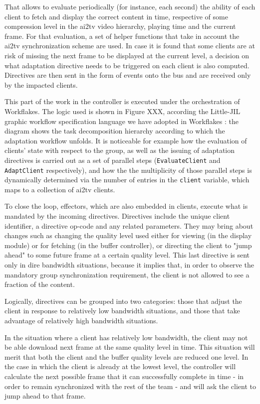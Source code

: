 \documentclass{sig-alternate}
\begin{document}
That allows to evaluate periodically (for instance, each second) the
ability of each client to fetch and display the correct content in
time, respective of some compression level in the ai2tv video
hierarchy, playing time and the current frame.  For that evaluation, a
set of helper functions that take in account the ai2tv synchronization
scheme are used. In case it is found that some clients are at risk of
missing the next frame to be displayed at the current level, a
decision on what adaptation directive needs to be triggered on each
client is also computed.  Directives are then sent in the form of
events onto the bus and are received only by the impacted clients.

This part of the work in the controller is executed under the
orchestration of Workflakes.  The logic used is shown in Figure XXX,
according the Little-JIL graphic workflow specification language we
have adopted in Workflakes \cite{L-JIL}: the diagram shows the task
decomposition hierarchy according to which the adaptation workflow
unfolds. It is noticeable for example how the evaluation of clients'
state with respect to the group, as well as the issuing of adaptation
directives is carried out as a set of parallel steps
(\texttt{EvaluateClient} and \texttt{AdaptClient} respectively), and
how the the multiplicity of those parallel steps is dynamically
determined via the number of entries in the \texttt{client} variable,
which maps to a collection of ai2tv clients.
%
%

To close the loop, effectors, which are also embedded in clients,
execute what is mandated by the incoming directives.  Directives
include the unique client identifier, a directive op-code and any
related parameters.  They may bring about changes such as changing the
quality level used either for viewing (in the display module) or for
fetching (in the buffer controller), or directing the client to "jump
ahead" to some future frame at a certain quality level.  This last
directive is sent only in dire bandwidth situations, because it
implies that, in order to observe the mandatory group synchronization
requirement, the client is not allowed to see a fraction of the
content.

Logically, directives can be grouped into two categories: those that
adjust the client in response to relatively low bandwidth situations,
and those that take advantage of relatively high bandwidth situations.

In the situation where a client has relatively low bandwidth, the
client may not be able download next frame at the same quality level
in time.  This situation will merit that both the client and the
buffer quality levels are reduced one level. In the case in which the
client is already at the lowest level, the controller will calculate
the next possible frame that it can successfully complete in time - in
order to remain synchronized with the rest of the team - and will ask
the client to jump ahead to that frame.
\end{document}
